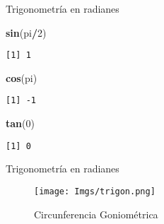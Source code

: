\documentclass[
  ignorenonframetext,
]{beamer}
\newenvironment{Shaded}{\begin{snugshade}}{\end{snugshade}}
\newcommand{\DecValTok}[1]{\textcolor[rgb]{0.00,0.00,0.81}{#1}}
\newcommand{\KeywordTok}[1]{\textcolor[rgb]{0.13,0.29,0.53}{\textbf{#1}}}
\newcommand{\NormalTok}[1]{#1}
\newcommand{\OperatorTok}[1]{\textcolor[rgb]{0.81,0.36,0.00}{\textbf{#1}}}
\begin{document}
\begin{frame}[fragile]{Trigonometría en radianes}
\protect\hypertarget{trigonometruxeda-en-radianes-1}{}

\begin{Shaded}
\begin{Highlighting}[]
\KeywordTok{sin}\NormalTok{(pi}\OperatorTok{/}\DecValTok{2}\NormalTok{)}
\end{Highlighting}
\end{Shaded}

\begin{verbatim}
[1] 1
\end{verbatim}

\begin{Shaded}
\begin{Highlighting}[]
\KeywordTok{cos}\NormalTok{(pi)}
\end{Highlighting}
\end{Shaded}

\begin{verbatim}
[1] -1
\end{verbatim}

\begin{Shaded}
\begin{Highlighting}[]
\KeywordTok{tan}\NormalTok{(}\DecValTok{0}\NormalTok{)}
\end{Highlighting}
\end{Shaded}

\begin{verbatim}
[1] 0
\end{verbatim}

\end{frame}

\begin{frame}{Trigonometría en radianes}
\protect\hypertarget{trigonometruxeda-en-radianes-2}{}

\begin{figure}
\centering
\texttt{[image: Imgs/trigon.png]}
\caption{Circunferencia Goniométrica}
\end{figure}

\end{frame}
\end{document}
